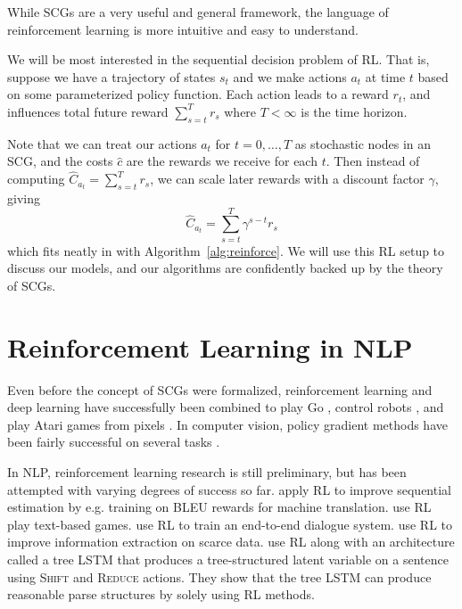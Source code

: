 \documentclass[12pt]{report}
\begin{document}

While SCGs are a very useful and general framework, the language of reinforcement learning is more intuitive and easy to understand.

We will be most interested in the sequential decision problem of RL. That is, suppose we have a trajectory of states $s_t$ and we make actions $a_t$ at time $t$ based on some parameterized policy function. Each action leads to a reward $r_t$, and influences total future reward $\sum_{s=t}^T r_s$ where $T < \infty$ is the time horizon.

Note that we can treat our actions $a_t$ for $ t = 0, \ldots, T$ as stochastic nodes in an SCG, and the costs $\hat{c}$ are the rewards we receive for each $t$. Then instead of computing $\hat{C}_{a_t} = \sum_{s=t}^T r_s$, we can scale later rewards with a discount factor $\gamma $, giving
\begin{equation}
\hat{C}_{a_t} = \sum_{s=t}^T \gamma^{s-t} r_s
\end{equation}
which fits neatly in with Algorithm~\ref{alg:reinforce}. We will use this RL setup to discuss our models, and our algorithms are confidently backed up by the theory of SCGs.





\section{Reinforcement Learning in NLP}

Even before the concept of SCGs were formalized, reinforcement learning and deep learning have successfully been combined to play Go \citep{Silver2016}, 
control robots \citep{Levine2016}, and play Atari games from pixels \citep{deepatari2015}.
In computer vision, policy gradient methods have been fairly successful on several tasks
\citep{mnih2014visualattention, ba2015visualattention, xu2015captioning}.

In NLP, reinforcement learning research is still preliminary, but has been attempted with varying degrees of success so far.
\citet{ranzato2015} apply RL to improve sequential estimation by e.g. training on BLEU rewards for machine translation.
\citet{Narasimhan2015} use RL play text-based games.
\citet{li2016dialogueRL} use RL to train an end-to-end dialogue system.
\citet{narasimhan2016} use RL to improve information extraction on scarce data.
\citet{Yogatama2017} use RL along with an architecture called a tree LSTM that produces a tree-structured latent variable on a sentence using \textsc{Shift} and \textsc{Reduce} actions. They show that the tree LSTM can produce reasonable parse structures by solely using RL methods.
\end{document}
